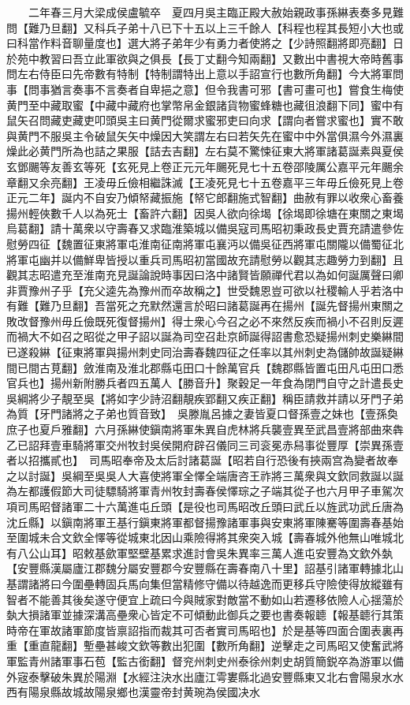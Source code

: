 　　二年春三月大梁成侯盧毓卒　夏四月吳主臨正殿大赦始親政事孫綝表奏多見難問【難乃旦翻】又科兵子弟十八已下十五以上三千餘人【科程也程其長短小大也或曰科當作料音聊量度也】選大將子弟年少有勇力者使將之【少詩照翻將即亮翻】日於苑中教習曰吾立此軍欲與之俱長【長丁丈翻今知兩翻】又數出中書視大帝時舊事問左右侍臣曰先帝數有特制【特制謂特出上意以手詔宣行也數所角翻】今大將軍問事【問事猶言奏事不言奏者自卑挹之意】但令我書可邪【書可畫可也】嘗食生梅使黄門至中藏取蜜【中藏中藏府也掌幣帛金銀諸貨物蜜蜂糖也藏徂浪翻下同】蜜中有鼠矢召問藏吏藏吏叩頭吳主曰黄門從爾求蜜邪吏曰向求【謂向者嘗求蜜也】實不敢與黄門不服吳主令破鼠矢矢中燥因大笑謂左右曰若矢先在蜜中中外當俱濕今外濕裏燥此必黄門所為也詰之果服【詰去吉翻】左右莫不驚悚征東大將軍諸葛誕素與夏侯玄鄧颺等友善玄等死【玄死見上卷正元元年颺死見七十五卷邵陵厲公嘉平元年颺余章翻又余亮翻】王凌毋丘儉相繼誅滅【王凌死見七十五卷嘉平三年毋丘儉死見上卷正元二年】誕内不自安乃傾帑藏振施【帑它郎翻施式智翻】曲赦有罪以收衆心畜養揚州輕俠數千人以為死士【畜許六翻】因吳人欲向徐堨【徐堨即徐塘在東關之東堨烏葛翻】請十萬衆以守壽春又求臨淮築城以備吳寇司馬昭初秉政長史賈充請遣參佐慰勞四征【魏置征東將軍屯淮南征南將軍屯襄沔以備吳征西將軍屯關隴以備蜀征北將軍屯幽并以備鮮卑皆授以重兵司馬昭初當國故充請慰勞以觀其志趣勞力到翻】且觀其志昭遣充至淮南充見誕論說時事因曰洛中諸賢皆願禪代君以為如何誕厲聲曰卿非賈豫州子乎【充父逵先為豫州而卒故稱之】世受魏恩豈可欲以社稷輸人乎若洛中有難【難乃旦翻】吾當死之充默然還言於昭曰諸葛誕再在揚州【誕先督揚州東關之敗改督豫州毋丘儉既死復督揚州】得士衆心今召之必不來然反疾而禍小不召則反遲而禍大不如召之昭從之甲子詔以誕為司空召赴京師誕得詔書愈恐疑揚州刺史樂綝間已遂殺綝【征東將軍與揚州刺史同治壽春魏四征之任率以其州刺史為儲帥故誕疑綝間已間古莧翻】斂淮南及淮北郡縣屯田口十餘萬官兵【魏郡縣皆置屯田凡屯田口悉官兵也】揚州新附勝兵者四五萬人【勝音升】聚穀足一年食為閉門自守之計遣長史吳綱將少子靚至吳【將如字少詩沼翻靚疾郢翻又疾正翻】稱臣請救并請以牙門子弟為質【牙門諸將之子弟也質音致】　吳滕胤呂據之妻皆夏口督孫壹之妹也【壹孫奐庶子也夏戶雅翻】六月孫綝使鎭南將軍朱異自虎林將兵襲壹異至武昌壹將部曲來犇乙已詔拜壹車騎將軍交州牧封吳侯開府辟召儀同三司衮冕赤舄事從豐厚【崇異孫壹者以招攜貳也】　司馬昭奉帝及太后討諸葛誕【昭若自行恐後有挾兩宫為變者故奉之以討誕】吳綱至吳吳人大喜使將軍全懌全端唐咨王祚將三萬衆與文欽同救誕以誕為左都護假節大司徒驃騎將軍青州牧封壽春侯懌琮之子端其從子也六月甲子車駕次項司馬昭督諸軍二十六萬進屯丘頭【是役也司馬昭改丘頭曰武丘以旌武功武丘唐為沈丘縣】以鎭南將軍王基行鎭東將軍都督揚豫諸軍事與安東將軍陳騫等圍壽春基始至圍城未合文欽全懌等從城東北因山乘險得將其衆突入城【壽春城外他無山唯城北有八公山耳】昭敕基歛軍堅壁基累求進討會吳朱異率三萬人進屯安豐為文欽外埶【安豐縣漢屬廬江郡魏分屬安豐郡今安豐縣在壽春南八十里】詔基引諸軍轉據北山基謂諸將曰今圍壘轉固兵馬向集但當精修守備以待越逸而更移兵守險使得放縱雖有智者不能善其後矣遂守便宜上疏曰今與賊家對敵當不動如山若遷移依險人心揺蕩於埶大損諸軍並據深溝高壘衆心皆定不可傾動此御兵之要也書奏報聼【報基聼行其策時帝在軍故諸軍節度皆禀詔指而裁其可否者實司馬昭也】於是基等四面合圍表裏再重【重直龍翻】塹壘甚峻文欽等數出犯圍【數所角翻】逆擊走之司馬昭又使奮武將軍監青州諸軍事石苞【監古銜翻】督兖州刺史州泰徐州刺史胡質簡鋭卒為游軍以備外宼泰擊破朱異於陽淵【水經注決水出廬江雩婁縣北過安豐縣東又北右會陽泉水水西有陽泉縣故城故陽泉鄉也漢靈帝封黄琬為侯國决水